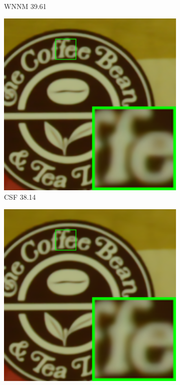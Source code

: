 \begin{figure}
\begin{subfigure}[t]{0.19\textwidth}
\caption{WNNM 39.61}
    \end{subfigure}
    \hfill
    \begin{subfigure}[t]{0.19\textwidth}
        \centering
        \includegraphics[width=1\textwidth]{images/guided/cc60/resize_br_CSF_CC_Noisy_Nikon_D800_ISO_1600_B2_109.png}
\caption{CSF 38.14}
    \end{subfigure}
    \hfill
    \begin{subfigure}[t]{0.19\textwidth}
        \centering
        \includegraphics[width=1\textwidth]{images/guided/cc60/resize_br_TRD_CC_Noisy_Nikon_D800_ISO_1600_B2_109.png}

\end{subfigure}
\end{figure}
